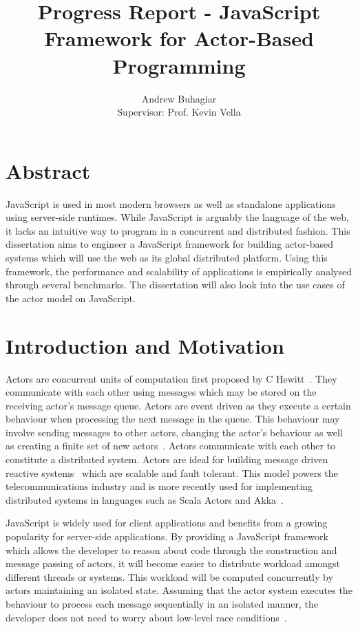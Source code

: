 \documentclass[12pt]{article}
\author{Andrew Buhagiar\\Supervisor: Prof. Kevin Vella}
\title{Progress Report - JavaScript Framework for Actor-Based Programming}
\begin{document}
\maketitle
\tableofcontents
\listoffigures
\thispagestyle{empty}
\newpage
{} 
\section{Abstract}
JavaScript is used in most modern browsers as well as standalone applications using server-side runtimes. While JavaScript is arguably the language of the web, it lacks an intuitive way to program in a concurrent and distributed fashion. This dissertation aims to engineer a JavaScript framework for building actor-based systems which will use the web as its global distributed platform. Using this framework, the performance and scalability of applications is empirically analysed through several benchmarks. The dissertation will also look into the use cases of the actor model on JavaScript.
\section{Introduction and Motivation}
Actors\cite{43years} are concurrent units of computation first proposed by C Hewitt~\cite{hewitt1973session}. They communicate with each other using messages which may be stored on the receiving actor's message queue. Actors are event driven as they execute a certain behaviour when processing the next message in the queue. This behaviour may involve sending messages to other actors, changing the actor's behaviour as well as creating a finite set of new actors~\cite{hewitt2010actor}. Actors communicate with each other to constitute a distributed system. Actors are ideal for building message driven reactive systems~\cite{reactivemanifesto} which are scalable and fault tolerant. This model powers the telecommunications industry and is more recently used for implementing distributed systems in languages such as Scala Actors and Akka~\cite{haller2012integration}.

JavaScript is widely used for client applications and benefits from a growing popularity for server-side applications. By providing a JavaScript framework which allows the developer to reason about code through the construction and message passing of actors, it will become easier to distribute workload amongst different threads or systems. This workload will be computed concurrently by actors maintaining an isolated state. Assuming that the actor system executes the behaviour to process each message sequentially in an isolated manner, the developer does not need to worry about low-level race conditions~\cite{43years}\cite{haller2010isolated}. 
\end{document}
